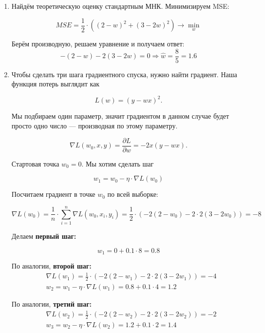 \begin{sol} 
    \begin{enumerate}
	\item  Найдём теоретическую оценку стандартным МНК. Минимизируем MSE: 
	
	\[
	MSE = \frac{1}{2} \cdot ((2 - w)^2 + (3 - 2 w)^2) \to \min_{w}
	\]
	
	Берём производную, решаем уравнение и получаем ответ: 
	\[
	- (2 - w)  - 2 (3 - 2 w) = 0 \Rightarrow \hat w = \frac{8}{5} = 1.6
	\]
	
	\item  Чтобы сделать три шага градиентного спуска, нужно найти градиент. Наша функция потерь выглядит как 
	
	\[
	L(w) = (y - w x)^2.
	\]
	
	Мы подбираем один параметр, значит градиентом в данном случае будет просто одно число --- производная по этому параметру. 
	
	\[ 
	 \nabla L(w_0, x, y) = \frac{\partial L}{\partial w} = -2 x (y - w x).
	\]
	
   Стартовая точка $w_0 = 0$. Мы хотим сделать шаг 
   
   \[
   w_1 = w_0 - \eta \cdot \nabla L(w_0)
   \]
	
	Посчитаем градиент в точке $w_0$ по всей выборке: 
	
	\[
	\nabla L(w_0) = \frac{1}{n} \cdot \sum_{i = 1}^n 	\nabla L(w_0, x_i, y_i)  = \frac{1}{2} \cdot (-2(2- w_0) - 2\cdot 2(3 - 2 w_0)) = -8
	\]
	
	Делаем \textbf{первый шаг:} 
	
	\[
	w_1 = 0 + 0.1 \cdot 8 = 0.8
	\]
	
   По аналогии, \textbf{второй шаг:}
	\begin{equation*}
	\begin{aligned}
	& \nabla L(w_1) =  \frac{1}{2} \cdot (-2(2 - w_1) - 2\cdot 2(3 - 2 w_1)) = -4 \\
	& w_2 = w_1 - \eta \cdot \nabla L(w_1) = 0.8 + 0.1 \cdot 4  = 1.2 
	\end{aligned}
	\end{equation*}
	
	По аналогии, \textbf{третий шаг:}
	\begin{equation*}
	\begin{aligned}
	& \nabla L(w_2) =  \frac{1}{2} \cdot (-2(2 - w_2) - 2\cdot 2(3 - 2 w_2)) = -2 \\
	& w_3 = w_2 - \eta \cdot \nabla L(w_2) = 1.2 + 0.1 \cdot 2  = 1.4
	\end{aligned}
	\end{equation*}
	

\end{enumerate}
\end{sol}
